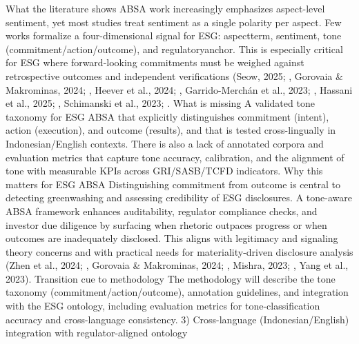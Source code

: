 What the literature shows
ABSA work increasingly emphasizes aspect-level sentiment, yet most studies treat sentiment as a single polarity per aspect. Few works formalize a four-dimensional signal for ESG: aspectterm, sentiment, tone (commitment/action/outcome), and regulatoryanchor. This is especially critical for ESG where forward-looking commitments must be weighed against retrospective outcomes and independent verifications (Seow, 2025; , Gorovaia & Makrominas, 2024; , Heever et al., 2024; , Garrido-Merchán et al., 2023; , Hassani et al., 2025; , Schimanski et al., 2023; .
What is missing
A validated tone taxonomy for ESG ABSA that explicitly distinguishes commitment (intent), action (execution), and outcome (results), and that is tested cross-lingually in Indonesian/English contexts. There is also a lack of annotated corpora and evaluation metrics that capture tone accuracy, calibration, and the alignment of tone with measurable KPIs across GRI/SASB/TCFD indicators.
Why this matters for ESG ABSA
Distinguishing commitment from outcome is central to detecting greenwashing and assessing credibility of ESG disclosures. A tone-aware ABSA framework enhances auditability, regulator compliance checks, and investor due diligence by surfacing when rhetoric outpaces progress or when outcomes are inadequately disclosed. This aligns with legitimacy and signaling theory concerns and with practical needs for materiality-driven disclosure analysis (Zhen et al., 2024; , Gorovaia & Makrominas, 2024; , Mishra, 2023; , Yang et al., 2023).
Transition cue to methodology
The methodology will describe the tone taxonomy (commitment/action/outcome), annotation guidelines, and integration with the ESG ontology, including evaluation metrics for tone-classification accuracy and cross-language consistency.
3) Cross-language (Indonesian/English) integration with regulator-aligned ontology

